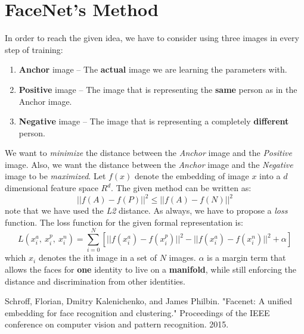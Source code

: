 \documentclass[journal, a4paper]{IEEEtran}
\begin{document}
\section{FaceNet's Method}
In order to reach the given idea, we have to consider using three images in every step of training:
\begin{enumerate}
	\item \textbf{Anchor} image -- The \textbf{actual} image we are learning the parameters with.
	\item \textbf{Positive} image -- The image that is representing the \textbf{same} person as in the Anchor image.
	\item \textbf{Negative} image -- The image that is representing a completely \textbf{different} person.
\end{enumerate}
We want to \textit{minimize} the distance between the \textit{Anchor} image and the \textit{Positive} image. Also, we want the distance between the \textit{Anchor} image and the \textit{Negative} image to be \textit{maximized}. Let $f(x)$ denote the embedding of image $x$ into a $d$ dimensional feature space $R^d$.  The given method can be written as:
$$
	||f(A) - f(P) ||^2 \leq ||f(A) - f(N) ||^2
$$
note that we have used the \textit{L2} distance. As always, we have to propose a \textit{loss} function. The loss function for the given formal representation is:
$$
	L(x_i^a,\ x_i^p,\ x_i^n) = \sum_{i = 0}^{N}[||f(x_i^a) - f(x_i^p)||^2 - ||f(x_i^a) - f(x_i^n)||^2 + \alpha]
$$
which  $x_i$ denotes the ith image in a set of $N$ images. $\alpha$ is a margin term that allows the faces for \textbf{one} identity to live on a \textbf{manifold}, while still enforcing the distance and discrimination from other identities.

\begin{thebibliography}{5}

	Schroff, Florian, Dmitry Kalenichenko, and James Philbin. "Facenet: A unified embedding for face recognition and clustering." Proceedings of the IEEE conference on computer vision and pattern recognition. 2015.

\end{thebibliography}

\end{document}

